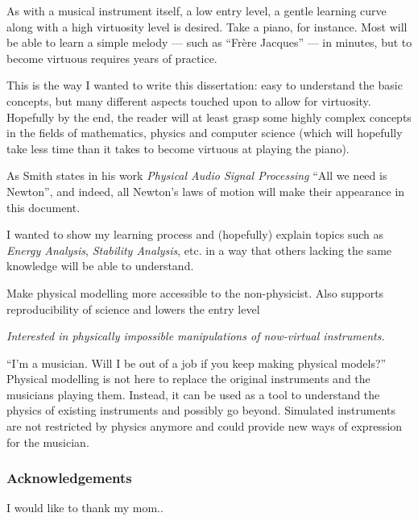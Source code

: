 As with a musical instrument itself, a low entry level, a gentle learning curve along with a high virtuosity level is desired. Take a piano, for instance. Most will be able to learn a simple melody — such as “Fr\`ere Jacques” — in minutes, but to become virtuous requires years of practice.

This is the way I wanted to write this dissertation: easy to understand the basic concepts, but many different aspects touched upon to allow for virtuosity. Hopefully by the end, the reader will at least grasp some highly complex concepts in the fields of mathematics, physics and computer science (which will hopefully take less time than it takes to become virtuous at playing the piano). 

As Smith states in his work \textit{Physical Audio Signal Processing} \cite{Smith2010} ``All we need is Newton'', and indeed, all Newton's laws of motion will make their appearance in this document.


I wanted to show my learning process and (hopefully) explain topics such as \textit{Energy Analysis}, \textit{Stability Analysis}, etc. in a way that others lacking the same knowledge %
will be able to understand.

Make physical modelling more accessible to the non-physicist. Also supports reproducibility of science and lowers the entry level   


\textit{Interested in physically impossible manipulations of now-virtual instruments.}


 ``I'm a musician. Will I be out of a job if you keep making physical models?'' Physical modelling is not here to replace the original instruments and the musicians playing them. Instead, it can be used as a tool to understand the physics of existing instruments and possibly go beyond. Simulated instruments are not restricted by physics anymore and could provide new ways of expression for the musician.

\subsubsection{Acknowledgements}

I would like to thank my mom..


